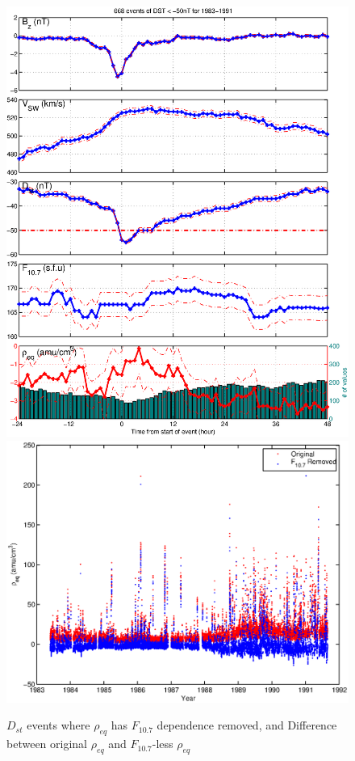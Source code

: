 \documentclass[10pt,twocolumn]{article}
\begin{document}
\begin{figure}[htp!]
\centering
\includegraphics[scale=0.45]{paperfigures/stormavs-dst-nof107.eps}
\includegraphics[scale=0.45]{paperfigures/f107removed.eps}
\caption{$D_{st}$ events where $\rho_{eq}$ has $F_{10.7}$ dependence removed, and Difference between original $\rho_{eq}$ and $F_{10.7}$-less $\rho_{eq}$}
\label{nof107}
\end{figure}
\end{document}
